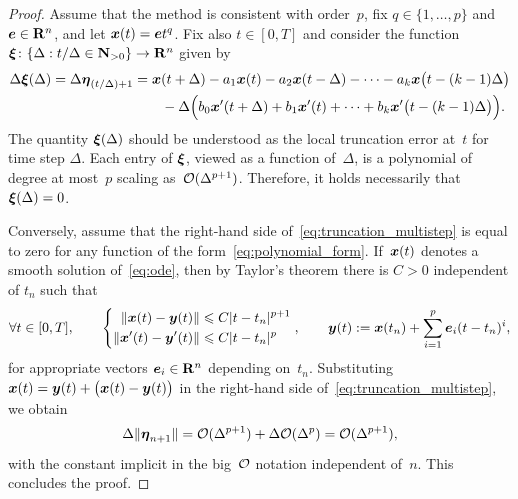 \begin{proof}
    Assume that the method is consistent with order~$p$, fix $q \in \{1, \dotsc, p\}$ and $\mathbf{\boldsymbol{e}} \in \mathbf R^n$,
    and let $\mathbf{\boldsymbol{x}}(t) = \mathbf{\boldsymbol{e}} t^{q}$.
    Fix also $t \in [0, T]$ and consider the function $\mathbf{\boldsymbol{\xi}}\colon \{\Delta : t/\Delta \in \mathbf N_{> 0}\} \to \mathbf R^n$ given by
    \begin{align*}
        \nonumber
        \Delta \mathbf{\boldsymbol{\xi}}(\Delta) = \Delta \mathbf{\boldsymbol{\eta}}_{(t/\Delta) +1}
            &= \mathbf{\boldsymbol{x}}(t + \Delta) - a_1 \mathbf{\boldsymbol{x}}(t) - a_2 \mathbf{\boldsymbol{x}}(t - \Delta) - \dotsb - a_k \mathbf{\boldsymbol{x}}\bigl(t - (k-1) \Delta\bigr) \\
            & \qquad- \Delta \Bigl( b_0 \mathbf{\boldsymbol{x}}'(t + \Delta) + b_1 \mathbf{\boldsymbol{x}}'(t) + \dotsb + b_k \mathbf{\boldsymbol{x}}'\bigl(t - (k-1) \Delta\bigr) \Bigr).
    \end{align*}
    The quantity $\mathbf{\boldsymbol{\xi}}(\Delta)$ should be understood as the local truncation error at~$t$ for time step $\Delta$.
    Each entry of $\mathbf{\boldsymbol{\xi}}$, viewed as a function of~$\Delta$,
    is a polynomial of degree at most~$p$ scaling as~$\mathcal O(\Delta^{p+1})$.
    Therefore, it holds necessarily that~$\mathbf{\boldsymbol{\xi}}(\Delta) = 0$.

    Conversely, assume that the right-hand side of~\eqref{eq:truncation_multistep} is equal to zero for any function of the form~\eqref{eq:polynomial_form}.
    If~$\mathbf{\boldsymbol{x}}(t)$ denotes a smooth solution of~\eqref{eq:ode},
    then by Taylor's theorem there is $C > 0$ independent of $t_n$ such that
    \[
        \forall t \in [0, T], \qquad
        \left\{
        \begin{aligned}
            \lVert\mathbf{\boldsymbol{x}}(t) - \mathbf{\boldsymbol{y}}(t)\rVert &\leqslant C|t-t_n|^{p+1} \\
            \lVert\mathbf{\boldsymbol{x}}'(t) - \mathbf{\boldsymbol{y}}'(t)\rVert &\leqslant C|t-t_n|^{p}
        \end{aligned}
        \right. ,
        \qquad
        \mathbf{\boldsymbol{y}}(t) := \mathbf{\boldsymbol{x}}(t_n) + \sum_{i=1}^{p} \mathbf{\boldsymbol{e}}_i (t-t_n)^i,
    \]
    for appropriate vectors $\mathbf{\boldsymbol{e}}_i \in \mathbf R^n$ depending on~$t_n$.
    Substituting $\mathbf{\boldsymbol{x}}(t) = \mathbf{\boldsymbol{y}}(t) + \bigl(\mathbf{\boldsymbol{x}}(t) - \mathbf{\boldsymbol{y}}(t)\bigr)$ in the right-hand side of~\eqref{eq:truncation_multistep},
    we obtain
    \[
        \Delta \lVert\mathbf{\boldsymbol{\eta}}_{n+1}\rVert = \mathcal O(\Delta^{p+1}) + \Delta \mathcal O(\Delta^p) = \mathcal O(\Delta^{p+1}),
    \]
    with the constant implicit in the big~$\mathcal O$ notation independent of~$n$.
    This concludes the proof.
\end{proof}
